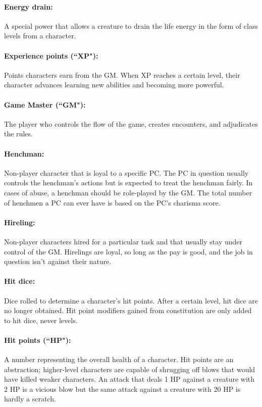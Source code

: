 \begin{multicols}{2}
\paragraph{Energy drain:} A special power that allows a creature to drain the life energy in the form of class levels from a character.

\paragraph{Experience points (``XP"):} Points characters earn from the GM.  When XP reaches a certain level, their character advances learning new abilities and becoming more powerful.

\paragraph{Game Master (``GM"):} The player who controls the flow of the game, creates encounters, and adjudicates the rules.

\paragraph{Henchman:} Non-player character that is loyal to a specific PC.  The PC in question usually controls the henchman's actions but is expected to treat the henchman fairly. In cases of abuse, a henchman should be role-played by the GM.  The total number of henchmen a PC can ever have is based on the PC's charisma score.

\paragraph{Hireling:} Non-player characters hired for a particular task and that usually stay under control of the GM.  Hirelings are loyal, so long as the pay is good, and the job in question isn't against their nature.

\paragraph{Hit dice:} Dice rolled to determine a character's hit points.  After a certain level, hit dice are no longer obtained.  Hit point modifiers gained from constitution are only added to hit dice, never levels.

\paragraph{Hit points (``HP"):} A number representing the overall health of a character.  Hit points are an abstraction; higher-level characters are capable of shrugging off blows that would have killed weaker characters.  An attack that deals 1 HP against a creature with 2 HP is a vicious blow but the same attack against a creature with 20 HP is hardly a scratch.  


\end{multicols}
